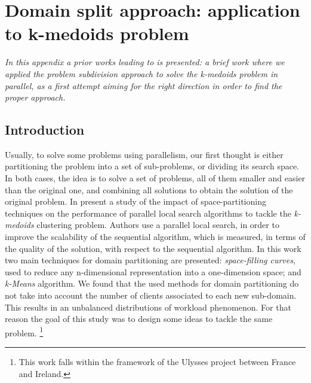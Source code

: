 \chapter{Domain split approach: application to k-medoids problem}
\label{chap:prior_split}
\textit{In this appendix a prior works leading to \posl{} is presented: a brief work where we applied the {\it problem subdivision} approach to solve the {\it k-medoids problem} in parallel, as a first attempt aiming for the right direction in order to find the proper approach.} 

\vspace{2ex}\vfill
\minitoc
\newpage

\section{Introduction}

Usually, to solve some problems using parallelism, our first thought is either partitioning the problem into a set of sub-problems, or dividing its search space. In both cases, the idea is to solve a set of problems, all of them smaller and easier than the original one, and combining all solutions to obtain the solution of the original problem. In \cite{Arbelaez2012}  present a study of the impact of space-partitioning techniques on the performance of parallel local search algorithms to tackle the \textit{k-medoids} clustering problem. Authors use a parallel local search, in order to improve the scalability of the sequential algorithm, which is measured, in terms of the quality of the solution, with respect to the sequential algorithm. In this work two main techniques for domain partitioning are presented: {\it space-filling curves}, used to reduce any n-dimensional representation into a one-dimension space; and {\it k-Means} algorithm. We found that the used methods for domain partitioning do not take into account the number of clients associated to each new sub-domain. This results in an unbalanced distributions of workload phenomenon. For that reason the goal of this study was to design some ideas to tackle the same problem. \footnote{This work falls within the framework of the Ulysses project between France and Ireland.}

